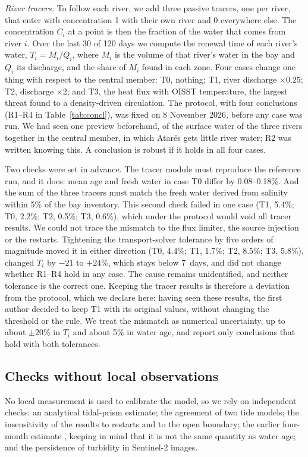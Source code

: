 \documentclass[a4paper,fleqn]{ems-dc}
\begin{document}
\emph{River tracers.} To follow each river, we add three passive tracers, one per river, that
enter with concentration 1 with their own river and 0 everywhere else. The concentration
$C_i$ at a point is then the fraction of the water that comes from river $i$. Over the last
30 of 120 days we compute the renewal time of each river's water, $T_i = M_i/Q_i$, where $M_i$
is the volume of that river's water in the bay and $Q_i$ its discharge, and the share of
$M_i$ found in each zone. Four cases change one thing with respect to the central member:
T0, nothing; T1, river discharge $\times0.25$; T2, discharge $\times2$; and T3, the heat flux
with OISST temperature, the largest threat found to a density-driven circulation. The
protocol, with four conclusions (R1--R4 in Table~\ref{tab:concl}), was fixed on 8 November
2026, before any case was run. We had seen one preview beforehand, of the surface water of
the three rivers together in the central member, in which Atar\'es gets little river water;
R2 was written knowing this. A conclusion is robust if it holds in all four cases.

Two checks were set in advance. The tracer module must reproduce the reference run, and it
does: mean age and fresh water in case T0 differ by 0.08--0.18\%. And the sum of the three
tracers must match the fresh water derived from salinity within 5\% of the bay inventory.
This second check failed in one case (T1, 5.4\%; T0, 2.2\%; T2, 0.5\%; T3, 0.6\%), which
under the protocol would void all tracer results. We could not trace the mismatch to the flux
limiter, the source injection or the restarts. Tightening the transport-solver tolerance by
five orders of magnitude moved it in either direction (T0, 4.4\%; T1, 1.7\%; T2, 8.5\%; T3,
5.8\%), changed $T_i$ by $-21$ to $+24$\%, which stays below 7~days, and did not change
whether R1--R4 hold in any case. The cause remains unidentified, and neither tolerance is
the correct one. Keeping the tracer results is therefore a deviation from the protocol,
which we declare here: having seen these results, the first author decided to keep T1 with
its original values, without changing the threshold or the rule. We treat the mismatch as
numerical uncertainty, up to about $\pm20$\% in $T_i$ and about 5\% in water age, and
report only conclusions that hold with both tolerances.

\subsection{Checks without local observations}\label{sec:eval}
No local measurement is used to calibrate the model, so we rely on independent checks: an
analytical tidal-prism estimate; the agreement of two tide models; the insensitivity of the
results to restarts and to the open boundary; the earlier four-month estimate
\citep{JICA2004}, keeping in mind that it is not the same quantity as water age; and the
persistence of turbidity in Sentinel-2 images.
\end{document}
